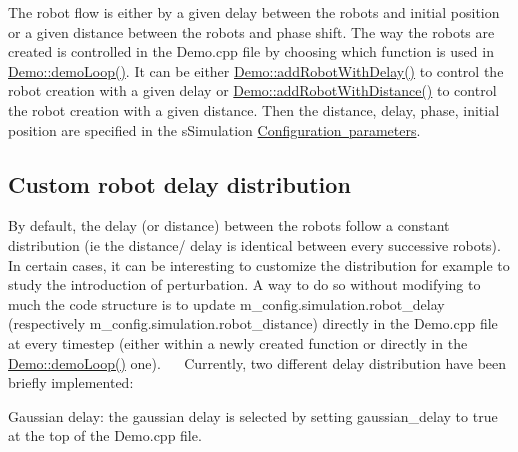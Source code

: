 The robot flow is either by a given delay between the robots and initial position or a given distance between the robots and phase shift. The way the robots are created is controlled in the Demo.\+cpp file by choosing which function is used in \mbox{\hyperlink{class_demo_a938c3b6ab1c98ce43f977dda9d4f2b3a}{Demo\+::demo\+Loop()}}. It can be either \mbox{\hyperlink{class_demo_a4636f708574c6be85334ff16373e2292}{Demo\+::add\+Robot\+With\+Delay()}} to control the robot creation with a given delay or \mbox{\hyperlink{class_demo_a37b03d288a1bf67f586cdfe1f9ba16af}{Demo\+::add\+Robot\+With\+Distance()}} to control the robot creation with a given distance. Then the distance, delay, phase, initial position are specified in the s\+Simulation \mbox{\hyperlink{index_param}{Configuration parameters}}. ~\newline
 \hypertarget{index_rob_del}{}\subsection{Custom robot delay distribution}\label{index_rob_del}
By default, the delay (or distance) between the robots follow a constant distribution (ie the distance/ delay is identical between every successive robots). In certain cases, it can be interesting to customize the distribution for example to study the introduction of perturbation. A way to do so without modifying to much the code structure is to update m\+\_\+config.\+simulation.\+robot\+\_\+delay (respectively m\+\_\+config.\+simulation.\+robot\+\_\+distance) directly in the Demo.\+cpp file at every timestep (either within a newly created function or directly in the \mbox{\hyperlink{class_demo_a938c3b6ab1c98ce43f977dda9d4f2b3a}{Demo\+::demo\+Loop()}} one).~\newline
 ~\newline
 Currently, two different delay distribution have been briefly implemented\+:
\begin{DoxyItemize}
\item Gaussian delay\+: the gaussian delay is selected by setting gaussian\+\_\+delay to true at the top of the Demo.\+cpp file.
\end{DoxyItemize}

